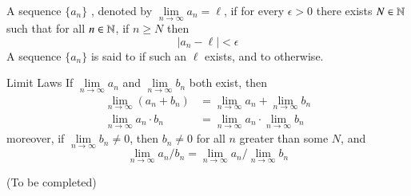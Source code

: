 \documentclass[12pt]{report}
\begin{document}
\begin{defn}{}{}
    A sequence $\{a_n\}$ , denoted by $\lim\limits_{n\rightarrow \infty}a_n = \ell$, if for every $\epsilon > 0$ there exists $N \in \mathbb N$ such that for all $n \in \mathbb N$, if $n \geq N$ then \begin{equation*}
        |a_n - \ell| < \epsilon
    \end{equation*}
    A sequence $\{a_n\}$ is said to  if such an $\ell$ exists, and to  otherwise.
\end{defn}

\begin{thm}{Limit Laws}{}
    If $\lim\limits_{n\rightarrow \infty}a_n$ and $\lim\limits_{n\rightarrow \infty}b_n$ both exist, then \begin{align*}
        \lim\limits_{n\rightarrow \infty}(a_n+b_n) &= \lim\limits_{n\rightarrow \infty}a_n + \lim\limits_{n\rightarrow \infty}b_n \\
        \lim\limits_{n\rightarrow \infty}a_n\cdot b_n &= \lim\limits_{n\rightarrow \infty}a_n\cdot \lim\limits_{n\rightarrow \infty} b_n 
    \end{align*}
    moreover, if $\lim\limits_{n\rightarrow \infty}b_n\neq 0$, then $b_n \neq 0$ for all $n$ greater than some $N$, and \begin{equation*}
        \lim\limits_{n\rightarrow \infty}a_n/b_n = \lim\limits_{n\rightarrow \infty}a_n/\lim\limits_{n\rightarrow \infty}b_n
    \end{equation*}
\end{thm}
\begin{proof*}{}{}
    (To be completed)
\end{proof*}
\end{document}
